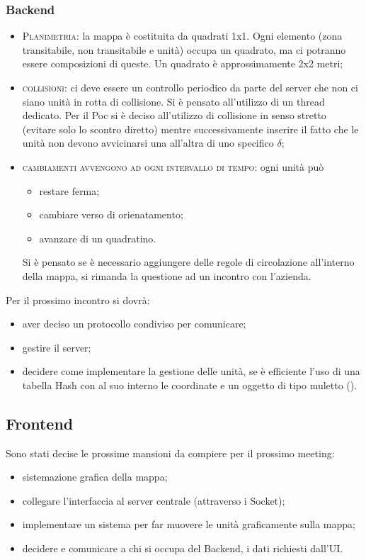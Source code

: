 \subsubsection{Backend}
\begin{itemize}
	\item \textsc{Planimetria}: la mappa è costituita da quadrati 1x1. Ogni elemento (zona transitabile, non transitabile e unità) occupa un quadrato, ma ci potranno essere composizioni di queste. Un quadrato è approssimamente 2x2 metri;
	\item \textsc{collisioni:} ci deve essere un controllo periodico da parte del server che non ci siano unità in rotta di collisione. Si è pensato all'utilizzo di un thread dedicato. Per il Poc si è deciso all'utilizzo di collisione in senso stretto (evitare solo lo scontro diretto) mentre successivamente inserire il fatto che le unità non devono avvicinarsi una all'altra di uno specifico $\delta$;
	\item \textsc{cambiamenti avvengono ad ogni intervallo di tempo:} ogni unità può 
	\begin{itemize}
		\item restare ferma;
		\item cambiare verso di orienatamento;
		\item avanzare di un quadratino.
	\end{itemize} 
	Si è pensato se è necessario aggiungere delle regole di circolazione all'interno della mappa, si rimanda la questione ad un incontro con l'azienda.
	
		
\end{itemize}
Per il prossimo incontro si dovrà:
\begin{itemize}
	\item aver deciso un protocollo condiviso per comunicare;
	\item gestire il server;
	\item decidere come implementare la gestione delle unità, se è efficiente l'uso di una tabella Hash con al suo interno le coordinate e un oggetto di tipo muletto ().
\end{itemize}

\subsection{Frontend}
Sono stati decise le prossime mansioni da compiere per il prossimo meeting:
\begin{itemize}
	\item sistemazione grafica della mappa;
	\item collegare l'interfaccia al server centrale (attraverso i Socket);
	\item implementare un sistema per far muovere le unità graficamente sulla mappa;
	\item decidere e comunicare a chi si occupa del Backend, i dati richiesti dall'UI.
\end{itemize}